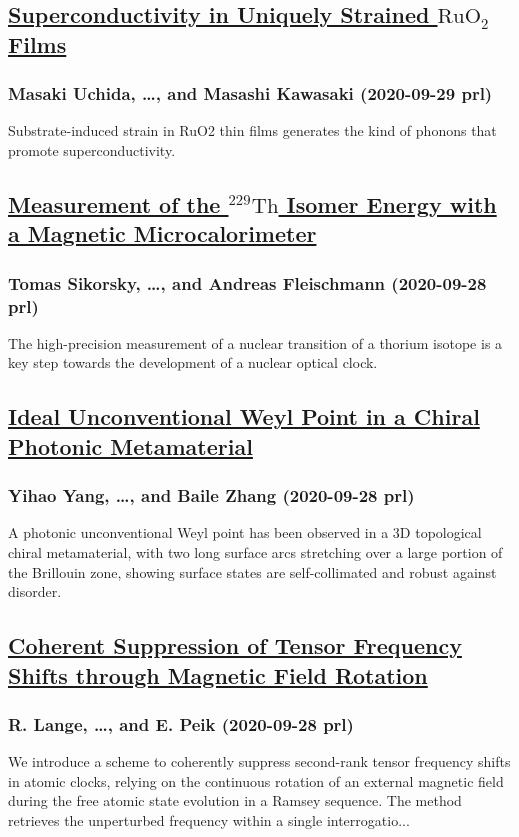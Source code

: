 \subsection*{\href{http://link.aps.org/doi/10.1103/PhysRevLett.125.147001}{Superconductivity in Uniquely Strained ${\mathrm{RuO}}_{2}$ Films}}
\subsubsection*{Masaki Uchida, \dots, and Masashi Kawasaki (2020-09-29 prl)}
Substrate-induced strain in RuO2 thin films generates the kind of phonons that promote superconductivity.
\subsection*{\href{http://link.aps.org/doi/10.1103/PhysRevLett.125.142503}{Measurement of the $^{229}\mathrm{Th}$ Isomer Energy with a Magnetic Microcalorimeter}}
\subsubsection*{Tomas Sikorsky, \dots, and Andreas Fleischmann (2020-09-28 prl)}
The high-precision measurement of a nuclear transition of a thorium isotope is a key step towards the development of a nuclear optical clock.
\subsection*{\href{http://link.aps.org/doi/10.1103/PhysRevLett.125.143001}{Ideal Unconventional Weyl Point in a Chiral Photonic Metamaterial}}
\subsubsection*{Yihao Yang, \dots, and Baile Zhang (2020-09-28 prl)}
A photonic unconventional Weyl point has been observed in a 3D topological chiral metamaterial, with two long surface arcs stretching over a large portion of the Brillouin zone, showing surface states are self-collimated and robust against disorder.
\subsection*{\href{http://link.aps.org/doi/10.1103/PhysRevLett.125.143201}{Coherent Suppression of Tensor Frequency Shifts through Magnetic Field Rotation}}
\subsubsection*{R. Lange, \dots, and E. Peik (2020-09-28 prl)}
We introduce a scheme to coherently suppress second-rank tensor frequency shifts in atomic clocks, relying on the continuous rotation of an external magnetic field during the free atomic state evolution in a Ramsey sequence. The method retrieves the unperturbed frequency within a single interrogatio...
